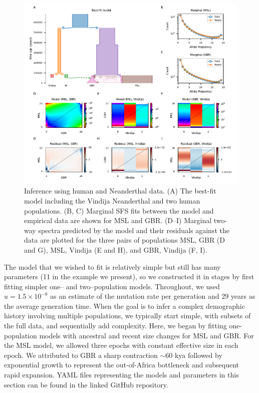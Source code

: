 \documentclass[]{article}
\begin{document}
\begin{figure}[t!]
    \includegraphics{../example2/fig2.pdf}
    \caption{
        Inference using human and Neanderthal data.
        (A) The best-fit model including the Vindija Neanderthal and two human
        populations.
        (B, C) Marginal SFS fits between the model and empirical data are shown
        for MSL and GBR.
        (D--I) Marginal two-way spectra predicted by the model and their residuals 
        against the data are plotted for the three pairs of populations MSL, GBR 
        (D and G), MSL, Vindija (E and H), and GBR, Vindija (F, I).
    }
    \label{fig:humans}
\end{figure}

The model that we wished to fit is relatively simple but still has many 
parameters (11 in the example we present), so we constructed it in stages by 
first fitting simpler one-- and two--population models.
Throughout, we used $u=1.5\times 10^{-8}$ as an estimate of the mutation rate per 
generation and 29 years as the average generation time. When the goal is to infer
a complex demographic history involving multiple populations, we typically start
simple, with subsets of the full data, and sequentially add complexity.
Here, we began by fitting 
one-population models with ancestral and recent size changes for MSL and GBR.
For the MSL model, we allowed three epochs with constant effective size in each 
epoch. We attributed to GBR a sharp contraction $\sim$60 kya followed by 
exponential growth to represent the out-of-Africa bottleneck and subsequent 
rapid expansion. YAML files representing the models and parameters in this 
section can be found in the linked GitHub repository.
\end{document}
